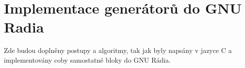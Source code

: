\section{Implementace generátorů do GNU Radia}

Zde  budou doplněny postupy a algoritmy, tak jak byly napsány v jazyce C a implementovány coby samostatné bloky do GNU Rádia.


